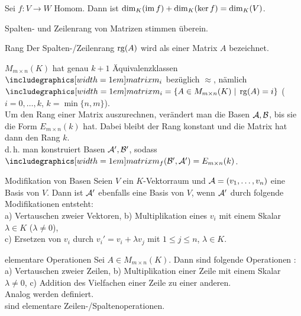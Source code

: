 \begin{Kor}
    Sei $f: V \rightarrow W$ Homom.
    Dann ist $\dim_K(\operatorname{im} f) + \dim_K(\ker f) = \dim_K(V)$.
\end{Kor}

\begin{Kor}
    Spalten- und Zeilenrang von Matrizen stimmen überein.
\end{Kor}

\begin{Def}{Rang}
    Der Spalten-/Zeilenrang $\operatorname{rg}(A)$ wird als  einer Matrix $A$
    bezeichnet.
\end{Def}

\pagebreak

\begin{Bem}
    $M_{m \times n}(K)$ hat genau $k + 1$ Äquivalenzklassen $\matrixm_i$
    bezüglich $\approx$, nämlich \\
    $\matrixm_i = \{A \in M_{m \times n}(K) \;|\;
    \rg(A) = i\}$ ($i = 0, \ldots, k$, $k = \min\{n, m\}$). \\
    Um den Rang einer Matrix auszurechnen, verändert man die Basen
    $\mathcal{A}, \mathcal{B}$, bis sie die Form $E_{m \times n}(k)$ hat.
    Dabei bleibt der Rang konstant und die Matrix hat dann den Rang $k$. \\
    d.\,h. man konstruiert Basen $\mathcal{A'}, \mathcal{B'}$, sodass
    $\hommatrix{f}{B'}{A'} = E_{m \times n}(k)$.
\end{Bem}

\begin{Lemma}{Modifikation von Basen}
    Seien $V$ ein $K$-Vektorraum und $\mathcal{A} = (v_1, \ldots, v_n)$ eine
    Basis von $V$.
    Dann ist $\mathcal{A'}$ ebenfalls eine Basis von $V$, wenn $\mathcal{A'}$
    durch folgende Modifikationen entsteht: \\
    a) Vertauschen zweier Vektoren, \qquad
    b) Multiplikation eines $v_i$ mit einem Skalar $\lambda \in K$
    ($\lambda \not= 0$), \\
    c) Ersetzen von $v_i$ durch $v_i' = v_i + \lambda v_j$ mit
    $1 \le j \le n$, $\lambda \in K$.
\end{Lemma}

\begin{Def}{elementare Operationen}
    Sei $A \in M_{m \times n}(K)$.
    Dann sind folgende Operationen :
    a) Vertauschen zweier Zeilen, \qquad
    b) Multiplikation einer Zeile mit einem Skalar $\lambda \not= 0$, \qquad
    c) Addition des Vielfachen einer Zeile zu einer anderen. \\
    Analog werden  definiert. \\
     sind elementare
    Zeilen-/Spaltenoperationen.
\end{Def}

